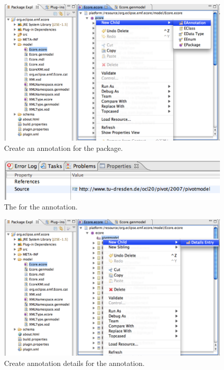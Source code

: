 \begin{figure}[!htbp]
	\centering
	\includegraphics[width=1.0\linewidth]{figures/pivotModelAdaption/CreateAnnotation}
	\caption{Create an annotation for the  package.}
	\label{pic:pivotModelAdaption:CreateAnnotation}
\end{figure}

\begin{figure}[!htbp]
	\centering
	\includegraphics[width=1.0\linewidth]{figures/pivotModelAdaption/AnnotationProperties}
	\caption{The  for the annotation.}
	\label{pic:pivotModelAdaption:AnnotationProperties}
\end{figure}

\begin{figure}[!htbp]
	\centering
	\includegraphics[width=1.0\linewidth]{figures/pivotModelAdaption/CreateAnnotationDetails}
	\caption{Create annotation details for the annotation.}
	\label{pic:pivotModelAdaption:CreateAnnotationDetails}
\end{figure}

